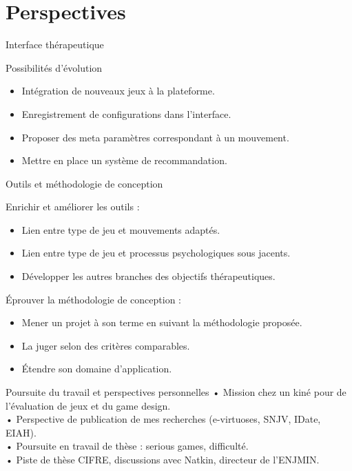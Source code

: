 \documentclass{beamer}
\begin{document}
	\section{Perspectives}
		\begin{frame}{Interface thérapeutique}	
			\begin{block}{Possibilités d'évolution}		
				\begin{itemize}
					\item Intégration de nouveaux jeux à la plateforme. \pause
					\item Enregistrement de configurations dans l'interface.\pause
					\item Proposer des meta paramètres correspondant à un mouvement.\pause
					\item Mettre en place un système de recommandation.	
				\end{itemize}
			\end{block}
		\end{frame}
		
		\begin{frame}{Outils et méthodologie de conception}
			\begin{block}{Enrichir et améliorer les outils :}\pause
				\begin{itemize}
					\item Lien entre type de jeu et mouvements adaptés.\pause
					\item Lien entre type de jeu et processus psychologiques sous jacents.\pause
					\item Développer les autres branches des objectifs thérapeutiques.\pause
				\end{itemize}
			\end{block}
				\begin{block}{Éprouver la méthodologie de conception :}\pause
					\begin{itemize}
						\item Mener un projet à son terme en suivant la méthodologie proposée.\pause
						\item La juger selon des critères comparables.\pause
						\item Étendre son domaine d'application.
					\end{itemize}
				\end{block}
		\end{frame}		
	
		\begin{frame}{Poursuite du travail et perspectives personnelles}
			• Mission chez un kiné pour de l'évaluation de jeux et du game design.\\
			• Perspective de publication de mes recherches (e-virtuoses, SNJV, IDate, EIAH).\\
			• Poursuite en travail de thèse : serious games, difficulté.\\
			• Piste de thèse CIFRE, discussions avec Natkin, directeur de l'ENJMIN.\\
		\end{frame}
		
\end{document}
